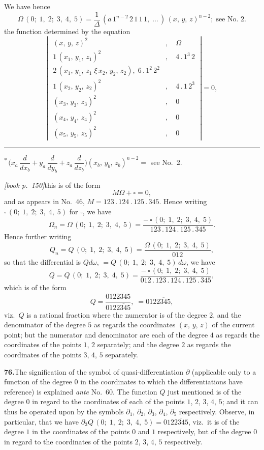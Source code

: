 \documentclass[11pt,a4paper]{article}
\theoremstyle{plain}
\theoremstyle{definition}
\theoremstyle{remark}
\providecommand{\bdet}[1]{\overline{#1}}
\begin{document}
We have hence
\[
\Omega\,(0;\;1,\;2;\;3,\;4,\;5) = \frac{1}{\Delta}\,(a\,1^{n-2}\,2\,1\,1\,1,\;\ldots\,)\,(x,\,y,\,z)^{n-2};\;\text{see No.\ 2.}
\]
the function determined by the equation
\[
\left|\;\begin{array}{cc}
(x,\,y,\,z)^{2} & ,\quad \Omega\\
1\,(x_1,\,y_1,\,z_1)^{2} & ,\quad 4\,.\,1^{3}\,2\\
2\,(x_1,\,y_1,\,z_1\;\xi\,x_2,\,y_2,\,z_2),\;6\,.\,1^{2}\,2^{2}\\
1\,(x_2,\,y_2,\,z_2)^{2} & ,\quad 4\,.\,1\,2^{3}\\
(x_3,\,y_3,\,z_3)^{2} & ,\quad 0\\
(x_4,\,y_4,\,z_4)^{2} & ,\quad 0\\
(x_5,\,y_5,\,z_5)^{2} & ,\quad 0
\end{array}\;\right| = 0,
\]
\bigskip
\hrule
\smallskip
\noindent\textsuperscript{*}\,$\bigl(x_a\,\dfrac{d}{dx_b} + y_a\,\dfrac{d}{dy_b} + z_a\,\dfrac{d}{dz_b}\bigr)(x_b,\,y_b,\,z_b)^{n-2} = $ see No.\ 2.

\medskip\noindent\textit{[book p.~150]}\quad this is of the form
\[
M\Omega + \square = 0,
\]
and as appears in No.\ 46, $M = 123\,.\,124\,.\,125\,.\,345$. Hence writing $\square\,(0;\;1,\;2;\;3,\;4,\;5)$ for $\square$, we have
\[
\Omega_n = \Omega\,(0;\;1,\;2;\;3,\;4,\;5) = \frac{-\,\square\,(0;\;1,\;2;\;3,\;4,\;5)}{123\,.\,124\,.\,125\,.\,345}.
\]
Hence further writing
\[
Q_n = Q\,(0;\;1,\;2;\;3,\;4,\;5) = \frac{\Omega\,(0;\;1,\;2;\;3,\;4,\;5)}{012},
\]
so that the differential is $Qd\omega$, $= Q\,(0;\;1,\;2;\;3,\;4,\;5)\,d\omega$, we have
\[
Q = Q\,(0;\;1,\;2;\;3,\;4,\;5) = \frac{-\,\square\,(0;\;1,\;2;\;3,\;4,\;5)}{012\,.\,123\,.\,124\,.\,125\,.\,345},
\]
which is of the form
\[
Q = \frac{012\bdet{2345}}{012\bdet{2345}},\;= 012\bdet{2345},
\]
viz.\ $Q$ is a rational fraction where the numerator is of the degree $2$, and the denominator of the degree $5$ as regards the coordinates $(x,\,y,\,z)$ of the current point; but the numerator and denominator are each of the degree $4$ as regards the coordinates of the points $1$, $2$ separately; and the degree $2$ as regards the coordinates of the points $3$, $4$, $5$ separately.

\medskip\noindent\textbf{76.}\quad The signification of the symbol of quasi-differentiation $\partial$ (applicable only to a function of the degree $0$ in the coordinates to which the differentiations have reference) is explained \textit{ante} No.\ 60. The function $Q$ just mentioned is of the degree $0$ in regard to the coordinates of each of the points $1$, $2$, $3$, $4$, $5$; and it can thus be operated upon by the symbols $\partial_1$, $\partial_2$, $\partial_3$, $\partial_4$, $\partial_5$ respectively. Observe, in particular, that we have $\partial_3 Q\,(0;\;1,\;2;\;3,\;4,\;5) = 012\bdet{2345}$, viz.\ it is of the degree $1$ in the coordinates of the points $0$ and $1$ respectively, but of the degree $0$ in regard to the coordinates of the points $2$, $3$, $4$, $5$ respectively.
\end{document}
